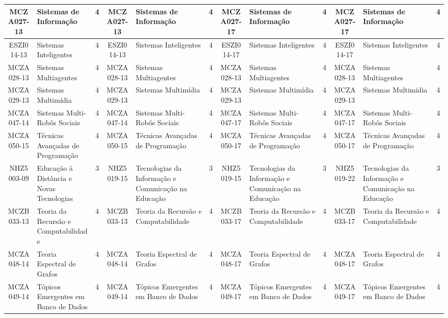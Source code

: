 \documentclass[a4paper]{article}
\begin{document}
\begin{landscape}
{\begin{longtable}{|c|p{.2\textheight}|c||c|p{.2\textheight}|c||c|p{.2\textheight}|c||c|p{.2\textheight}|c|}
MCZA027-13 & Sistemas de Informação & 4 &
MCZA027-13 & Sistemas de Informação & 4 &
MCZA027-17 & Sistemas de Informação & 4 &
MCZA027-17 & Sistemas de Informação & 4\\ \hline

ESZI014-13 & Sistemas Inteligentes & 4 &
ESZI014-13 & Sistemas Inteligentes & 4 &
ESZI014-17 & Sistemas Inteligentes & 4 & 
ESZI014-17 & Sistemas Inteligentes & 4\\ \hline

MCZA028-13 & Sistemas Multiagentes & 4 &
MCZA028-13 & Sistemas Multiagentes & 4 &
MCZA028-13 & Sistemas Multiagentes & 4 &
MCZA028-13 & Sistemas Multiagentes & 4\\ \hline

MCZA029-13 & Sistemas Multimídia & 4 &
MCZA029-13 & Sistemas Multimídia & 4 &
MCZA029-13 & Sistemas Multimídia & 4 &
MCZA029-13 & Sistemas Multimídia & 4\\ \hline

MCZA047-14 & Sistemas Multi-Robôs Sociais & 4 &
MCZA047-14 & Sistemas Multi-Robôs Sociais & 4 &
MCZA047-17 & Sistemas Multi-Robôs Sociais & 4 &
MCZA047-17 & Sistemas Multi-Robôs Sociais & 4\\ \hline

MCZA050-15 & Técnicas Avançadas de Programação & 4 &
MCZA050-15 & Técnicas Avançadas de Programação & 4 &
MCZA050-17 & Técnicas Avançadas de Programação & 4 &
MCZA050-17 & Técnicas Avançadas de Programação & 4\\ \hline

NHZ5003-09 & Educação à Distância e Novas Tecnologias & 3 &
NHZ5019-15 & Tecnologias da Informação e Comunicação na Educação & 3 &
NHZ5019-15 & Tecnologias da Informação e Comunicação na Educação & 3 &
NHZ5019-22 & Tecnologias da Informação e Comunicação na Educação & 3\\ \hline

MCZB033-13 & Teoria da Recursão e Computabilidade & 4 &
MCZB033-13 & Teoria da Recursão e Computabilidade & 4 &
MCZB033-17 & Teoria da Recursão e Computabilidade & 4 &
MCZB033-17 & Teoria da Recursão e Computabilidade & 4\\ \hline

MCZA048-14 & Teoria Espectral de Grafos & 4 &
MCZA048-14 & Teoria Espectral de Grafos & 4 &
MCZA048-17 & Teoria Espectral de Grafos & 4 &
MCZA048-17 & Teoria Espectral de Grafos & 4\\ \hline

MCZA049-14 & Tópicos Emergentes em Banco de Dados & 4 &
MCZA049-14 & Tópicos Emergentes em Banco de Dados & 4 &
MCZA049-17 & Tópicos Emergentes em Banco de Dados & 4 &
MCZA049-17 & Tópicos Emergentes em Banco de Dados & 4\\ \hline


\end{longtable}}
\end{landscape}
\end{document}
